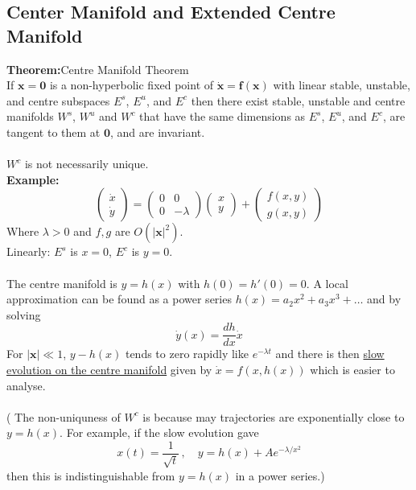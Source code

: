 \documentclass{article}
\newcommand{\example}{\textbf{Example:}}                    %
\newcommand{\theorem}{\textbf{Theorem:}}                    %
\newcommand{\bx}{\bm{x}}                                    %
\newcommand{\xeq}[1] { \dot{\bm{ #1 }} = \bm{f}(\bm{ #1}) } %
\begin{document}
\subsection{Center Manifold and Extended Centre Manifold}
\theorem Centre Manifold Theorem
\\
If $\bx = \bm{0}$ is a non-hyperbolic fixed point of $\xeq{x}$ with linear
stable, unstable, and centre subspaces $E^s$, $E^u$, and $E^c$ then there 
exist stable, unstable and centre manifolds $W^s$, $W^u$ and $W^c$ that have
the same dimensions as $E^s$, $E^u$, and $E^c$, are tangent to them at
$\bm{0}$, and are invariant.
\\
\\
$W^c$ is not necessarily unique.
\\
\example\
\[ \left( \begin{array}{c} \dot{x} \\ \dot{y} \end{array} \right) =
\left( \begin{array}{cr} 0 & 0 \\ 0 & -\lambda \end{array} \right)
\left( \begin{array}{c} x \\ y \end{array} \right) +
\left( \begin{array}{c} f(x,y) \\ g(x,y) \end{array} \right) \]
Where $\lambda >0$ and $f,g$ are $O(|\bx|^2)$.
\\
Linearly: %
$E^s$ is $x=0$, $E^c$ is $y=0$.
\\
\\
The centre manifold is $y=h(x)$ with $h(0) = h'(0) =0$. A local 
approximation can be found as a power series $h(x) = a_2 x^2 + a_3 x^3 + \dots$
and by solving
\[ \dot{y}(x) = \frac{dh}{dx} \dot{x} \]
For $|\bx| \ll 1$, $y-h(x)$ tends to zero rapidly like $e^{-\lambda t}$ and 
there is then \underline{slow evolution on the centre manifold} given by
$\dot{x} = f(x,h(x))$ which is easier to analyse.
\\
\\
( The non-uniquness of $W^c$ is because may trajectories are exponentially 
close to $y=h(x)$. For example, if the slow evolution gave 
\[ x(t) = \frac{1}{\sqrt{t}} \, , \quad y = h(x) + Ae^{-\lambda/x^2} \]
then this is indistinguishable from $y=h(x)$ in a power series.)
\\
\\
\end{document}
